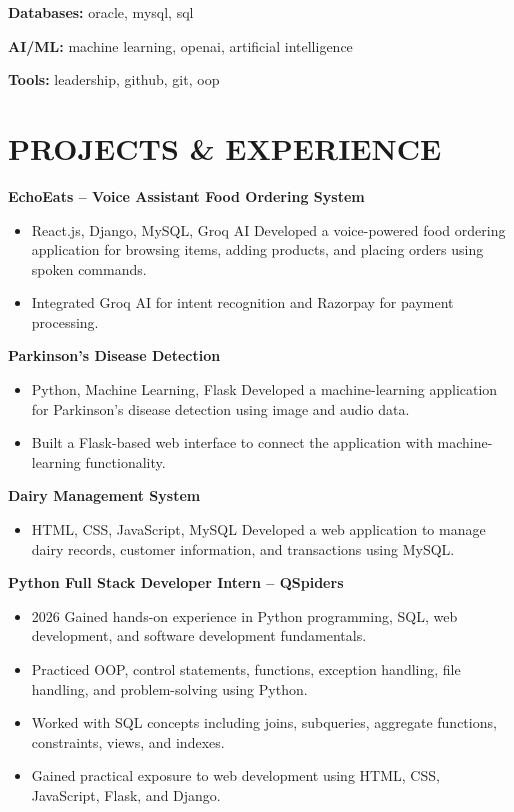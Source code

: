 \documentclass[10pt,a4paper]{extarticle}
\begin{document}
\textbf{Databases:} oracle, mysql, sql

\textbf{AI/ML:} machine learning, openai, artificial intelligence

\textbf{Tools:} leadership, github, git, oop


\section*{PROJECTS \& EXPERIENCE}

\noindent \textbf{EchoEats – Voice Assistant Food Ordering System}
\begin{itemize}[leftmargin=*, parsep=0pt, itemsep=1pt, topsep=1pt]
    \item React.js, Django, MySQL, Groq AI Developed a voice-powered food ordering application for browsing items, adding products, and placing orders using spoken commands.
    \item Integrated Groq AI for intent recognition and Razorpay for payment processing.
\end{itemize}

\noindent \textbf{Parkinson’s Disease Detection}
\begin{itemize}[leftmargin=*, parsep=0pt, itemsep=1pt, topsep=1pt]
    \item Python, Machine Learning, Flask Developed a machine-learning application for Parkinson’s disease detection using image and audio data.
    \item Built a Flask-based web interface to connect the application with machine-learning functionality.
\end{itemize}

\noindent \textbf{Dairy Management System}
\begin{itemize}[leftmargin=*, parsep=0pt, itemsep=1pt, topsep=1pt]
    \item HTML, CSS, JavaScript, MySQL Developed a web application to manage dairy records, customer information, and transactions using MySQL.
\end{itemize}

\noindent \textbf{Python Full Stack Developer Intern – QSpiders}
\begin{itemize}[leftmargin=*, parsep=0pt, itemsep=1pt, topsep=1pt]
    \item 2026 Gained hands-on experience in Python programming, SQL, web development, and software development fundamentals.
    \item Practiced OOP, control statements, functions, exception handling, file handling, and problem-solving using Python.
    \item Worked with SQL concepts including joins, subqueries, aggregate functions, constraints, views, and indexes.
    \item Gained practical exposure to web development using HTML, CSS, JavaScript, Flask, and Django.
\end{itemize}
\end{document}
